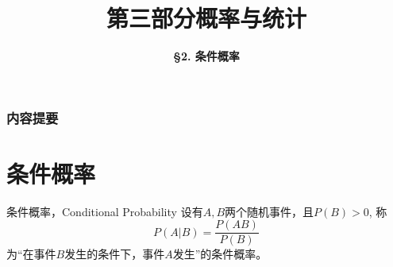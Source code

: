 \documentclass[10pt]{beamer}
\title[Probability \& Statistics]{\LARGE \bfseries 第三部分\quad 概率与统计} %
\author[Conditional Probability] %
{\Large \bfseries \S 2. 条件概率}
\date{}
\begin{document}

\begin{frame}

\titlepage %

\end{frame}


\begin{frame}
\frametitle{内容提要} %
\tableofcontents %
\end{frame}


\section{条件概率}


\begin{frame}

\begin{block}{条件概率，Conditional Probability}
设有$A,B$两个随机事件，且$P(B) > 0$, 称
$$P(A|B) = \dfrac{P(AB)}{P(B)}$$
为``在事件$B$发生的条件下，事件$A$发生''的条件概率。
\end{block}

\end{frame}

\end{document}
